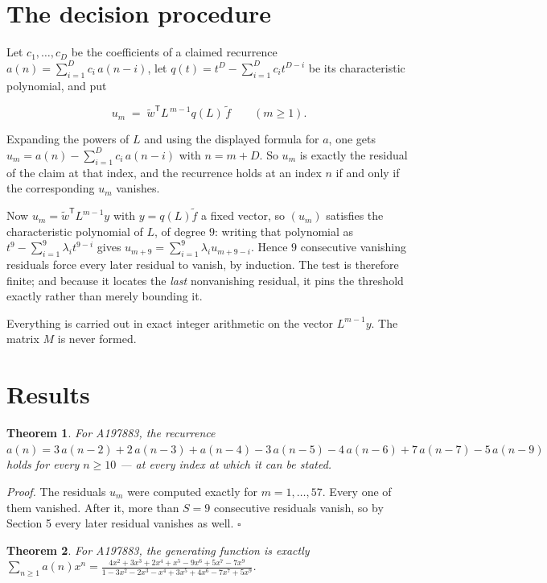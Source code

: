 \documentclass[11pt]{article}
\newtheorem{theorem}{Theorem}
\theoremstyle{definition}
\begin{document}
\section{The decision procedure}

Let $c_1,\dots,c_D$ be the coefficients of a claimed recurrence $a(n) = \sum_{i=1}^{D} c_i\,a(n-i)$, let $q(t) = t^{D} - \sum_{i=1}^{D} c_i t^{D-i}$ be its characteristic polynomial, and put

\[u_m \;=\; \tilde w^{\mathsf T} L^{\,m-1} q(L)\,\tilde f \qquad (m \ge 1).\]

Expanding the powers of $L$ and using the displayed formula for $a$, one gets $u_m = a(n) - \sum_{i=1}^{D} c_i\,a(n-i)$ with $n = m + D$. So $u_m$ is exactly the residual of the claim at that index, and the recurrence holds at an index $n$ if and only if the corresponding $u_m$ vanishes.

Now $u_m = \tilde w^{\mathsf T} L^{m-1} y$ with $y = q(L)\tilde f$ a fixed vector, so $(u_m)$ satisfies the characteristic polynomial of $L$, of degree $9$: writing that polynomial as $t^{9} - \sum_{i=1}^{9} \lambda_i t^{9-i}$ gives $u_{m+9} = \sum_{i=1}^{9} \lambda_i u_{m+9-i}$. Hence $9$ consecutive vanishing residuals force every later residual to vanish, by induction. The test is therefore finite; and because it locates the {\itshape last} nonvanishing residual, it pins the threshold exactly rather than merely bounding it.

Everything is carried out in exact integer arithmetic on the vector $L^{m-1}y$. The matrix $M$ is never formed.

\section{Results}

\begin{theorem} For A197883, the recurrence $a(n) = 3\,a(n-2) + 2\,a(n-3) + a(n-4) - 3\,a(n-5) - 4\,a(n-6) + 7\,a(n-7) - 5\,a(n-9)$ holds for every $n \ge 10$ --- at every index at which it can be stated.\end{theorem}

{\itshape Proof.} The residuals $u_m$ were computed exactly for $m = 1,\dots,57$. Every one of them vanished. After it, more than $S = 9$ consecutive residuals vanish, so by Section 5 every later residual vanishes as well. $\square$

\begin{theorem} For A197883, the generating function is exactly $\sum_{n\ge 1} a(n)x^n = \frac{4x^{2} + 3x^{3} + 2x^{4} + x^{5} - 9x^{6} + 5x^{7} - 7x^{9}}{1 - 3x^{2} - 2x^{3} - x^{4} + 3x^{5} + 4x^{6} - 7x^{7} + 5x^{9}}$.\end{theorem}
\end{document}
